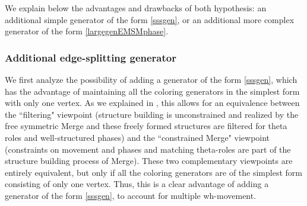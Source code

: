 \documentclass[12pt]{amsart}
\numberwithin{equation}{section}
\begin{document}
We explain below the advantages and drawbacks of both hypothesis: an additional simple generator
of the form \eqref{sssgen}, or an additional more complex generator of the form \eqref{largegenEMSMphase}.

\subsubsection{Additional edge-splitting generator}\label{gensssSec}

We first analyze the possibility of adding a generator of the form \eqref{sssgen}, which has
the advantage of maintaining all the coloring generators in the simplest form with only one
vertex. As we explained in \cite{MHL}, this allows for an equivalence between the ``filtering"
viewpoint (structure building is unconstrained and realized by the free symmetric Merge
and these freely formed structures are filtered for theta roles and well-structured phases)
and the ``constrained Merge" viewpoint (constraints on movement and phases and
matching theta-roles are part of the structure building process of Merge). These two
complementary viewpoints are entirely equivalent, but only if all the coloring generators
are of the simplest form consisting of only one vertex. Thus, this is a clear advantage of
adding a generator of the form \eqref{sssgen}, to account for multiple wh-movement.
\end{document}
